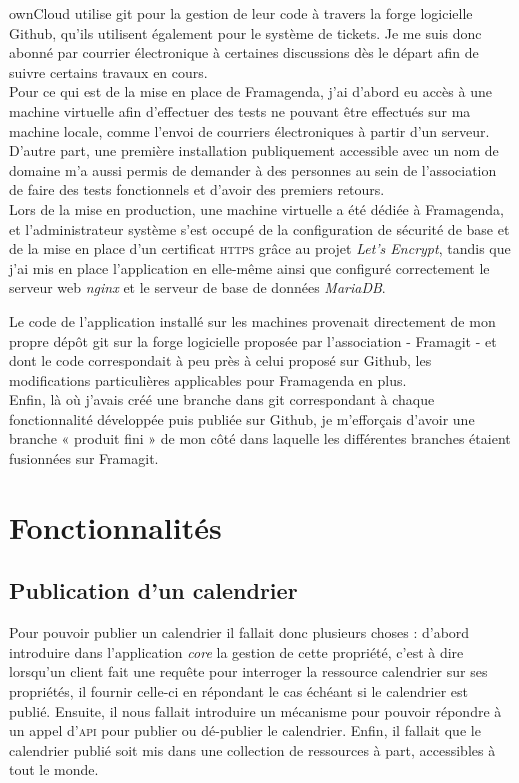 \documentclass[10pt,a4paper, twoside]{report}
\begin{document}
	ownCloud utilise git pour la gestion de leur code à travers la forge logicielle Github, qu'ils utilisent également pour le système de tickets. Je me suis donc abonné par courrier électronique à certaines discussions dès le départ afin de suivre certains travaux en cours.
	\\
	
	Pour ce qui est de la mise en place de Framagenda, j'ai d'abord eu accès à une machine virtuelle afin d'effectuer des tests ne pouvant être effectués sur ma machine locale, comme l'envoi de courriers électroniques à partir d'un serveur. D'autre part, une première installation publiquement accessible avec un nom de domaine m'a aussi permis de demander à des personnes au sein de l'association de faire des tests fonctionnels et d'avoir des premiers retours.
	\\
	
	Lors de la mise en production, une machine virtuelle a été dédiée à Framagenda, et l'administrateur système s'est occupé de la configuration de sécurité de base et de la mise en place d'un certificat \textsc{https} grâce au projet \textit{Let's Encrypt}, tandis que j'ai mis en place l'application en elle-même ainsi que configuré correctement le serveur web \textit{nginx} et le serveur de base de données \textit{MariaDB}.
	
	Le code de l'application installé sur les machines provenait directement de mon propre dépôt git sur la forge logicielle proposée par l'association - Framagit - et dont le code correspondait à peu près à celui proposé sur Github, les modifications particulières applicables pour Framagenda en plus.
	\\
	
	Enfin, là où j'avais créé une branche dans git correspondant à chaque fonctionnalité développée puis publiée sur Github, je m'efforçais d'avoir une branche « produit fini » de mon côté dans laquelle les différentes branches étaient fusionnées sur Framagit.
	
	\section{Fonctionnalités}
	\subsection{Publication d'un calendrier}
	Pour pouvoir publier un calendrier il fallait donc plusieurs choses : d'abord introduire dans l'application \textit{core} la gestion de cette propriété, c'est à dire lorsqu'un client fait une requête pour interroger la ressource calendrier sur ses propriétés, il fournir celle-ci en répondant le cas échéant si le calendrier est publié.
	Ensuite, il nous fallait introduire un mécanisme pour pouvoir répondre à un appel d'\textsc{api} pour publier ou dé-publier le calendrier. Enfin, il fallait que le calendrier publié soit mis dans une collection de ressources à part, accessibles à tout le monde.
	
\end{document}
